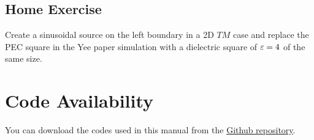 \documentclass[12pt]{article}
\begin{document}
\subsection*{Home Exercise}

\begin{mdframed}[backgroundcolor=blue!20]
  Create a sinusoidal source on the left boundary in a 2D $TM$ case and replace the PEC square in the Yee paper simulation with a dielectric square of $\varepsilon = 4$ of the same size.
\end{mdframed}

\section{Code Availability}

You can download the codes used in this manual from the \href{https://github.com/hasantahir/HFCS-Labs}{Github repository}.



\end{document}

